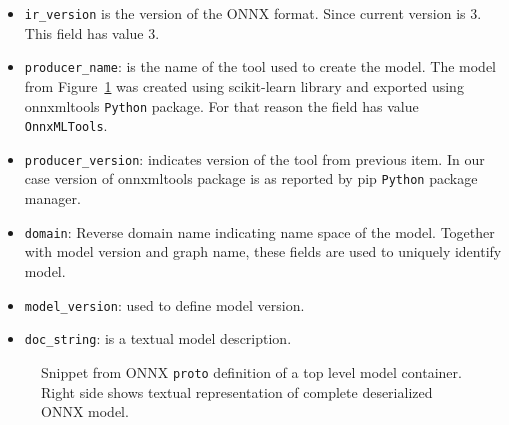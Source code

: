 \documentclass[english, 12pt, a4paper, elec, utf8, online]{aaltothesis}
\begin{document}
\begin{itemize}
\item
\texttt{ir\_version} is the version of the ONNX format. Since current version is 3. This field has value 3.
\item
\texttt{producer\_name}: is the name of the tool used to create the model. The model from Figure~\ref{fig:ModelProto} was created using scikit-learn library and exported using onnxmltools \texttt{Python} package. For that reason the field has value \texttt{OnnxMLTools}.
\item
\texttt{producer\_version}: indicates version of the tool from previous item. In our case version of onnxmltools package is as reported by pip \texttt{Python} package manager.
\item
\texttt{domain}: Reverse domain name indicating name space of the model. Together with model version and graph name, these fields are used to uniquely identify model.
\item
\texttt{model\_version}: used to define model version.
\item
\texttt{doc\_string}: is a textual model description. 
\end{itemize}


\begin{figure}[h!]
\begin{subfigure}[t]{0.6\textwidth}

\end{subfigure}
\begin{subfigure}[t]{0.6\textwidth}

\end{subfigure}

\caption{Snippet from ONNX \texttt{proto} definition of a top level model container. Right side shows textual representation of complete deserialized ONNX model.}\label{fig:ModelProto}
\end{figure}
\end{document}
